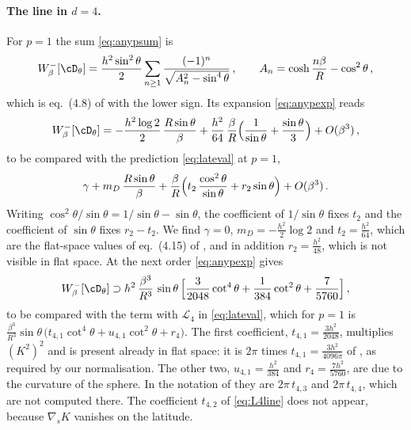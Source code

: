 \documentclass[a4paper,11pt]{article}
\begin{document}
	\paragraph{The line in $d=4$.}
	For $p=1$ the sum \eqref{eq:anypsum} is
	\begin{equation}\label{eq:linesum}
		W^-_\beta[\cD_\theta]=\frac{h^2\sin^2\theta}{2}\sum_{n\ge1}\frac{(-1)^n}{\sqrt{A_n^2-\sin^4\theta}}\, ,\qquad A_n=\cosh\frac{n\beta}{R}-\cos^2\theta\, ,
	\end{equation}
which is eq.~(4.8) of \cite{BMP} with the lower sign. Its expansion \eqref{eq:anypexp} reads
	\begin{equation}\label{eq:lineexp}
		W^-_\beta[\cD_\theta]=-\frac{h^2\log2}{2}\,\frac{R\sin\theta}{\beta}+\frac{h^2}{64}\,\frac{\beta}{R}\Bigl(\frac{1}{\sin\theta}+\frac{\sin\theta}{3}\Bigr)+O(\beta^3)\, ,
	\end{equation}
	to be compared with the prediction \eqref{eq:lateval} at $p=1$,
	\begin{equation}
		\gamma+m_D\,\frac{R\sin\theta}{\beta}+\frac{\beta}{R}\Bigl(t_2\,\frac{\cos^2\theta}{\sin\theta}+r_2\sin\theta\Bigr)+O(\beta^3)\, .
	\end{equation}
	Writing $\cos^2\theta/\sin\theta=1/\sin\theta-\sin\theta$, the coefficient of $1/\sin\theta$ fixes $t_2$ and the coefficient of $\sin\theta$ fixes $r_2-t_2$. We find $\gamma=0$, $m_D=-\tfrac{h^2}{2}\log2$ and $t_2=\tfrac{h^2}{64}$, which are the flat-space values of eq.~(4.15) of \cite{BMP}, and in addition $r_2=\tfrac{h^2}{48}$, which is not visible in flat space. At the next order \eqref{eq:anypexp} gives
	\begin{equation}\label{eq:lineb3}
		W^-_\beta[\cD_\theta]\supset h^2\,\frac{\beta^3}{R^3}\,\sin\theta\,\Bigl[\frac{3}{2048}\cot^4\theta+\frac{1}{384}\cot^2\theta+\frac{7}{5760}\Bigr]\, ,
	\end{equation}
	to be compared with the term with $\mathcal{L}_4$ in \eqref{eq:lateval}, which for $p=1$ is $\tfrac{\beta^3}{R^3}\sin\theta\,\bigl(t_{4,1}\cot^4\theta+u_{4,1}\cot^2\theta+r_4\bigr)$. The first coefficient, $t_{4,1}=\tfrac{3h^2}{2048}$, multiplies $(K^2)^2$ and is present already in flat space: it is $2\pi$ times $t_{4,1}=\tfrac{3h^2}{4096\pi}$ of \cite{BMP}, as required by our normalisation. The other two, $u_{4,1}=\tfrac{h^2}{384}$ and $r_4=\tfrac{7h^2}{5760}$, are due to the curvature of the sphere. In the notation of \cite{BMP} they are $2\pi\,t_{4,3}$ and $2\pi\,t_{4,4}$, which are not computed there. The coefficient $t_{4,2}$ of \eqref{eq:L4line} does not appear, because $\nabla_sK$ vanishes on the latitude.
\end{document}
